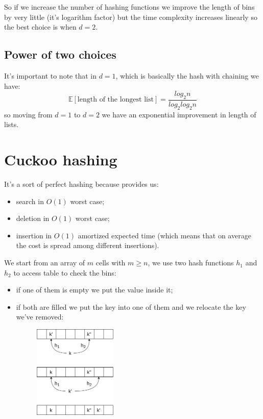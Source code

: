 So if we increase the number of hashing functions we improve the length of bins by very little (it's logarithm factor) but the time complexity increases linearly so the best choice is when $d = 2$.

\subsection{Power of two choices}
It's important to note that in $d=1$, which is basically the hash with chaining we have:
$$
    \mathbb{E}[\text{length of the longest list}] = \frac{log_2 n}{log_2 log_2 n}
$$
so moving from $d=1$ to $d=2$ we have an exponential improvement in length of lists.

\section{Cuckoo hashing}
It's a sort of perfect hashing because provides us:
\begin{itemize}
    \item search in $O(1)$ worst case;
    \item deletion in $O(1)$ worst case;
    \item insertion in $O(1)$ amortized expected time (which means that on average the cost is spread among different insertions).
\end{itemize}

We start from an array of $m$ cells with $m \geq n$, we use two hash functions $h_1$ and $h_2$ to access table to check the bins:
\begin{itemize}
    \item if one of them is empty we put the value inside it;
    \item if both are filled we put the key into one of them and we relocate the key we've removed:
    \begin{figure}[H]
        \centering
        \includegraphics[width=150px]{images/7_Hashing/cuckoo_relocation.png}
    \end{figure}
\end{itemize}

